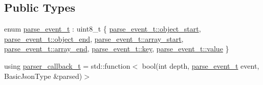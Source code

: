 \subsection*{Public Types}
\begin{DoxyCompactItemize}
\item 
enum \hyperlink{classnlohmann_1_1detail_1_1parser_a37ac88c864dda495f72cb62776b0bebe}{parse\+\_\+event\+\_\+t} \+: uint8\+\_\+t \{ \newline
\hyperlink{classnlohmann_1_1detail_1_1parser_a37ac88c864dda495f72cb62776b0bebeae73f17027cb0acbb537f29d0a6944b26}{parse\+\_\+event\+\_\+t\+::object\+\_\+start}, 
\hyperlink{classnlohmann_1_1detail_1_1parser_a37ac88c864dda495f72cb62776b0bebeaf63e2a2468a37aa4f394fcc3bcb8249c}{parse\+\_\+event\+\_\+t\+::object\+\_\+end}, 
\hyperlink{classnlohmann_1_1detail_1_1parser_a37ac88c864dda495f72cb62776b0bebeaa4388a3d92419edbb1c6efd4d52461f3}{parse\+\_\+event\+\_\+t\+::array\+\_\+start}, 
\hyperlink{classnlohmann_1_1detail_1_1parser_a37ac88c864dda495f72cb62776b0bebea49642fb732aa2e112188fba1f9d3ef7f}{parse\+\_\+event\+\_\+t\+::array\+\_\+end}, 
\newline
\hyperlink{classnlohmann_1_1detail_1_1parser_a37ac88c864dda495f72cb62776b0bebea3c6e0b8a9c15224a8228b9a98ca1531d}{parse\+\_\+event\+\_\+t\+::key}, 
\hyperlink{classnlohmann_1_1detail_1_1parser_a37ac88c864dda495f72cb62776b0bebea2063c1608d6e0baf80249c42e2be5804}{parse\+\_\+event\+\_\+t\+::value}
 \}
\item 
using \hyperlink{classnlohmann_1_1detail_1_1parser_ad250ad4f2b4af4a497e727c963162ff1}{parser\+\_\+callback\+\_\+t} = std\+::function$<$ bool(int depth, \hyperlink{classnlohmann_1_1detail_1_1parser_a37ac88c864dda495f72cb62776b0bebe}{parse\+\_\+event\+\_\+t} event, Basic\+Json\+Type \&parsed)$>$
\end{DoxyCompactItemize}
